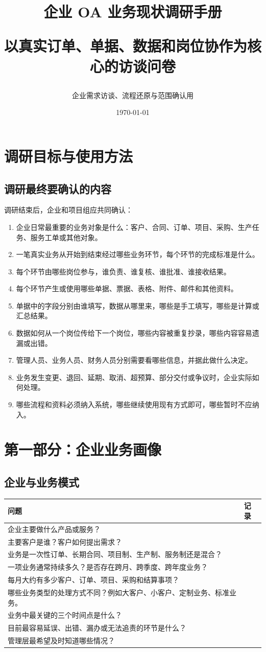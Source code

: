 \documentclass[UTF8,a4paper,11pt]{ctexart}
\title{企业 OA 业务现状调研手册\par\large 以真实订单、单据、数据和岗位协作为核心的访谈问卷}
\author{企业需求访谈、流程还原与范围确认用}
\date{\today}
\begin{document}
\maketitle
\tableofcontents
\newpage

\section{调研目标与使用方法}
\subsection{调研最终要确认的内容}
调研结束后，企业和项目组应共同确认：
\begin{enumerate}
  \item 企业日常最重要的业务对象是什么：客户、合同、订单、项目、采购、生产任务、服务工单或其他对象。
  \item 一笔真实业务从开始到结束经过哪些业务环节，每个环节的完成标准是什么。
  \item 每个环节由哪些岗位参与，谁负责、谁复核、谁批准、谁接收结果。
  \item 每个环节产生或使用哪些单据、票据、表格、附件、邮件和其他资料。
  \item 单据中的字段分别由谁填写，数据从哪里来，哪些是手工填写，哪些是计算或汇总结果。
  \item 数据如何从一个岗位传给下一个岗位，哪些内容被重复抄录，哪些内容容易遗漏或出错。
  \item 管理人员、业务人员、财务人员分别需要看哪些信息，并据此做什么决定。
  \item 业务发生变更、退回、延期、取消、超预算、部分交付或争议时，企业实际如何处理。
  \item 哪些流程和资料必须纳入系统，哪些继续使用现有方式即可，哪些暂时不应纳入。
\end{enumerate}

\section{第一部分：企业业务画像}
\subsection{企业与业务模式}
\begin{longtable}{p{}p{}}
\toprule
问题 & 记录 \\
\midrule
企业主要做什么产品或服务？ & \\
主要客户是谁？客户如何提出需求？ & \\
业务是一次性订单、长期合同、项目制、生产制、服务制还是混合？ & \\
一项业务通常持续多久？是否存在跨月、跨季度、跨年度业务？ & \\
每月大约有多少客户、订单、项目、采购和结算事项？ & \\
哪些业务类型的处理方式不同？例如大客户、小客户、定制业务、标准业务。 & \\
业务中最关键的三个时间点是什么？ & \\
目前最容易延误、出错、漏办或无法追责的环节是什么？ & \\
管理层最希望及时知道哪些情况？ & \\
\bottomrule
\end{longtable}
\end{document}
